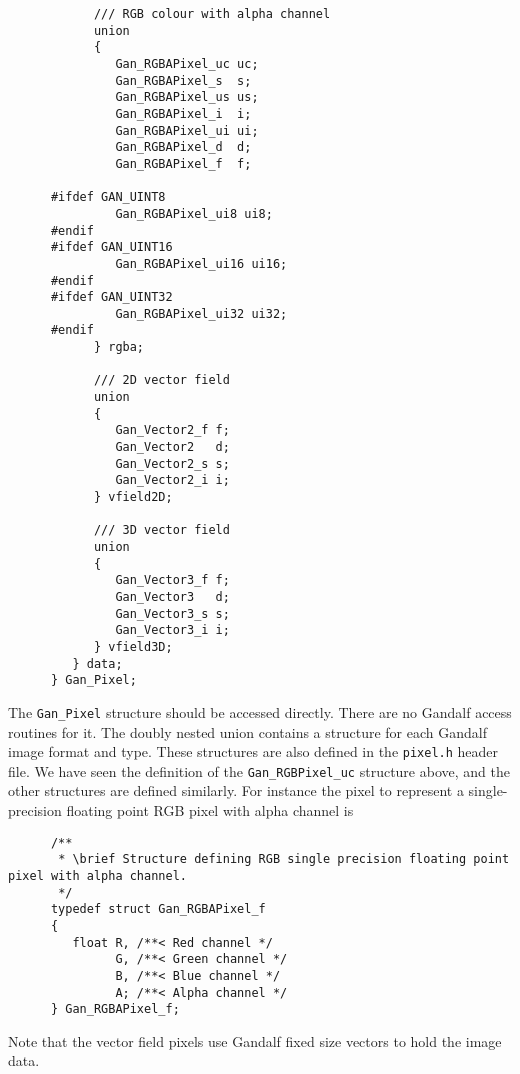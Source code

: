 \begin{verbatim}
            /// RGB colour with alpha channel
            union
            {
               Gan_RGBAPixel_uc uc;
               Gan_RGBAPixel_s  s;
               Gan_RGBAPixel_us us;
               Gan_RGBAPixel_i  i;
               Gan_RGBAPixel_ui ui;
               Gan_RGBAPixel_d  d;
               Gan_RGBAPixel_f  f;

      #ifdef GAN_UINT8
               Gan_RGBAPixel_ui8 ui8;
      #endif
      #ifdef GAN_UINT16
               Gan_RGBAPixel_ui16 ui16;
      #endif
      #ifdef GAN_UINT32
               Gan_RGBAPixel_ui32 ui32;
      #endif
            } rgba;

            /// 2D vector field
            union
            {
               Gan_Vector2_f f;
               Gan_Vector2   d;
               Gan_Vector2_s s;
               Gan_Vector2_i i;
            } vfield2D;

            /// 3D vector field
            union
            {
               Gan_Vector3_f f;
               Gan_Vector3   d;
               Gan_Vector3_s s;
               Gan_Vector3_i i;
            } vfield3D;
         } data;
      } Gan_Pixel;
\end{verbatim}
The {\tt Gan\_Pixel} structure should be accessed directly. There are no
Gandalf access routines for it. The doubly nested union contains a structure
for each Gandalf image format and type. These structures are also defined
in the {\tt pixel.h} header file. We have seen the definition of the
{\tt Gan\_RGBPixel\_uc} structure above, and the other structures are
defined similarly. For instance the pixel to represent a single-precision
floating point RGB pixel with alpha channel is
\begin{verbatim}
      /**
       * \brief Structure defining RGB single precision floating point pixel with alpha channel.
       */
      typedef struct Gan_RGBAPixel_f
      {
         float R, /**< Red channel */
               G, /**< Green channel */
               B, /**< Blue channel */
               A; /**< Alpha channel */
      } Gan_RGBAPixel_f;
\end{verbatim}
Note that the vector field pixels use Gandalf fixed size vectors to hold
the image data.

